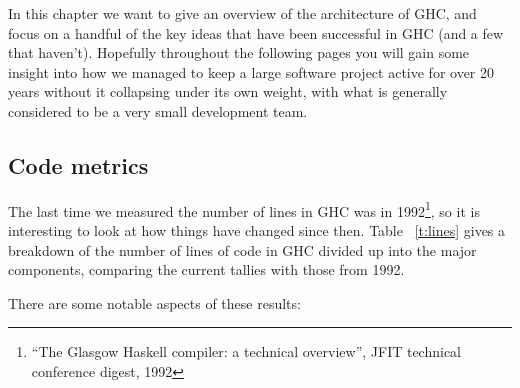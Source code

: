 \documentclass{article}
\begin{document}
In this chapter we want to give an overview of the architecture of
GHC, and focus on a handful of the key ideas that have been successful
in GHC (and a few that haven't).  Hopefully throughout the following
pages you will gain some insight into how we managed to keep a large
software project active for over 20 years without it collapsing under
its own weight, with what is generally considered to be a very small
development team.

% 
% 
% 
% 

%

\subsection{Code metrics}

The last time we measured the number of lines in GHC was in
1992\footnote{``The Glasgow Haskell compiler: a technical overview'',
  JFIT technical conference digest, 1992}, so it is interesting to
look at how things have changed since then.  Table ~\ref{t:lines}
gives a breakdown of the number of lines of code in GHC divided up
into the major components, comparing the current tallies with those
from 1992.

There are some notable aspects of these results:
\end{document}
